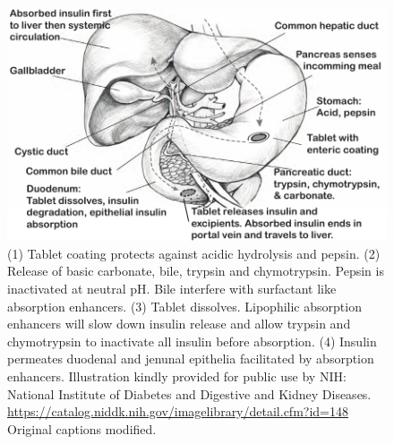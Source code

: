 \begin{figure}[ht]

\includegraphics{graphics/intro_anatomy2.pdf}
\caption{(1) Tablet coating protects against acidic hydrolysis and pepsin. (2) Release of basic carbonate, bile, trypsin and chymotrypsin. Pepsin is inactivated at neutral pH. Bile interfere with surfactant like absorption enhancers. (3) Tablet dissolves. Lipophilic absorption enhancers will slow down insulin release and allow trypsin and chymotrypsin to inactivate all insulin before absorption. (4) Insulin permeates duodenal and jenunal epithelia facilitated by absorption enhancers. Illustration kindly provided for public use by NIH: National Institute of Diabetes and Digestive and Kidney Diseases. \url{https://catalog.niddk.nih.gov/imagelibrary/detail.cfm?id=148} Original captions modified.}
\label{intro_glucoseTolerance}
\end{figure}

